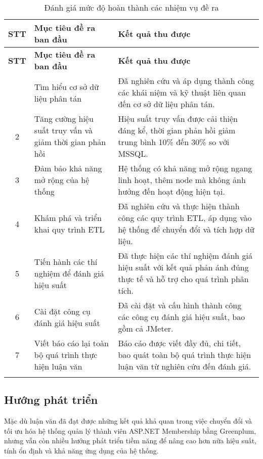 \begin{longtable}{|c|p{8cm}|p{8cm}|}
\hline
\textbf{STT} & \textbf{Mục tiêu đề ra ban đầu} & \textbf{Kết quả thu được} \\ \hline
\endfirsthead
\hline
\textbf{STT} & \textbf{Mục tiêu đề ra ban đầu} & \textbf{Kết quả thu được} \\ \hline
\endhead
\hline
\endfoot
\endlastfoot
1 & Tìm hiểu cơ sở dữ liệu phân tán & Đã nghiên cứu và áp dụng thành công các khái niệm và kỹ thuật liên quan đến cơ sở dữ liệu phân tán. \\ \hline
2 & Tăng cường hiệu suất truy vấn và giảm thời gian phản hồi & Hiệu suất truy vấn được cải thiện đáng kể, thời gian phản hồi giảm trung bình 10\% đến 30\% so với MSSQL. \\ \hline
3 & Đảm bảo khả năng mở rộng của hệ thống & Hệ thống có khả năng mở rộng ngang linh hoạt, thêm node mà không ảnh hưởng đến hoạt động hiện tại. \\ \hline
4 & Khám phá và triển khai quy trình ETL & Đã nghiên cứu và thực hiện thành công các quy trình ETL, áp dụng vào hệ thống để chuyển đổi và tích hợp dữ liệu. \\ \hline
5 & Tiến hành các thí nghiệm để đánh giá hiệu suất & Đã thực hiện các thí nghiệm đánh giá hiệu suất với kết quả phản ánh đúng thực tế và hỗ trợ cho quá trình phân tích. \\ \hline
6 & Cài đặt công cụ đánh giá hiệu suất & Đã cài đặt và cấu hình thành công các công cụ đánh giá hiệu suất, bao gồm cả JMeter. \\ \hline
7 & Viết báo cáo lại toàn bộ quá trình thực hiện luận văn & Báo cáo được viết đầy đủ, chi tiết, bao quát toàn bộ quá trình thực hiện luận văn từ nghiên cứu đến đánh giá. \\ \hline
\caption{Đánh giá mức độ hoàn thành các nhiệm vụ đề ra} \\
\end{longtable}



\subsection{Hướng phát triển}

Mặc dù luận văn đã đạt được những kết quả khả quan trong việc chuyển đổi và tối ưu hóa hệ thống quản lý thành viên ASP.NET Membership bằng Greenplum, nhưng vẫn còn nhiều hướng phát triển tiềm năng để nâng cao hơn nữa hiệu suất, tính ổn định và khả năng ứng dụng của hệ thống.

